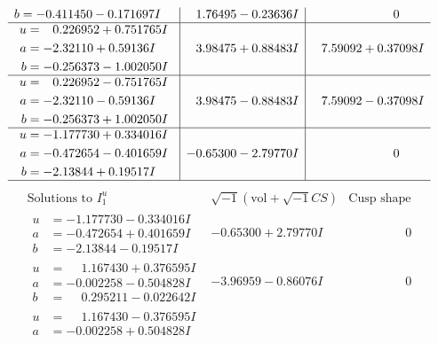 \documentclass[1p]{elsarticle_modified}
\theoremstyle{definition}
\newcommand{\I}{\sqrt{-1}}
\begin{document}
$$\begin{array}{c|c|c}
\begin{aligned}
b &= -0.411450 - 0.171697 I\end{aligned}
 & \phantom{-}1.76495 - 0.23636 I & \phantom{-0.000000 } 0 \\ \hline\begin{aligned}
u &= \phantom{-}0.226952 + 0.751765 I \\
a &= -2.32110 + 0.59136 I \\
b &= -0.256373 - 1.002050 I\end{aligned}
 & \phantom{-}3.98475 + 0.88483 I & \phantom{-}7.59092 + 0.37098 I \\ \hline\begin{aligned}
u &= \phantom{-}0.226952 - 0.751765 I \\
a &= -2.32110 - 0.59136 I \\
b &= -0.256373 + 1.002050 I\end{aligned}
 & \phantom{-}3.98475 - 0.88483 I & \phantom{-}7.59092 - 0.37098 I \\ \hline\begin{aligned}
u &= -1.177730 + 0.334016 I \\
a &= -0.472654 - 0.401659 I \\
b &= -2.13844 + 0.19517 I\end{aligned}
 & -0.65300 - 2.79770 I & \phantom{-0.000000 } 0\\
 \hline 
 \end{array}$$\newpage$$\begin{array}{c|c|c}  
\text{Solutions to }I^u_{1}& \I (\text{vol} + \sqrt{-1}CS) & \text{Cusp shape}\\
 \hline 
\begin{aligned}
u &= -1.177730 - 0.334016 I \\
a &= -0.472654 + 0.401659 I \\
b &= -2.13844 - 0.19517 I\end{aligned}
 & -0.65300 + 2.79770 I & \phantom{-0.000000 } 0 \\ \hline\begin{aligned}
u &= \phantom{-}1.167430 + 0.376595 I \\
a &= -0.002258 - 0.504828 I \\
b &= \phantom{-}0.295211 - 0.022642 I\end{aligned}
 & -3.96959 - 0.86076 I & \phantom{-0.000000 } 0 \\ \hline\begin{aligned}
u &= \phantom{-}1.167430 - 0.376595 I \\
a &= -0.002258 + 0.504828 I \\

\end{aligned}
\end{array}$$
\end{document}
